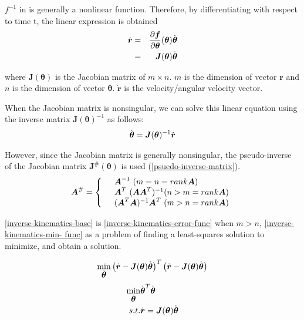 $f^{-1}$ in  is generally a nonlinear function.
Therefore, by differentiating  with respect to time t, the linear expression is obtained
\begin{eqnarray}
 \dot{\bm{r}} &=& \frac{\partial \bm{f}}{\partial \bm{\theta}}
   (\bm{\theta})\dot{\bm{\theta}} \\
 &=& \bm{J}(\bm{\theta})\dot{\bm{\theta}}
 \eqlabel{inverse-kinematics-base}
\end{eqnarray}

where $\bm{J}(\bm{\theta})$ is the Jacobian matrix of $m \times n$.
$m$ is the dimension of vector $\bm{r}$ and $n$ is the dimension of vector $\bm{\theta}$.
$\bm{\dot{r}}$ is the velocity/angular velocity vector.

When the Jacobian matrix is nonsingular, we can solve this linear equation using the inverse matrix $\bm{J}(\bm{\theta})^{-1}$ as follows:
\begin{eqnarray}
  \dot{\bm{\theta}} = \bm{J}(\bm{\theta})^{-1}\dot{\bm{r}}
  \eqlabel{inverse-kinematics}
\end{eqnarray}

However, since the Jacobian matrix is generally nonsingular, the pseudo-inverse of the Jacobian matrix $\bm{J}^{\#}(\bm{\theta})$ is used (\eqref{psuedo-inverse-matrix}).
\begin{eqnarray}
 \bm{A}^{\#} = \left\{
                \begin{array}{l l}
                 & \bm{A}^{-1} \ ( m = n = rank \bm{A}) \\
                 & \bm{A}^T \ (\bm{A}\bm{A}^T)^{-1} ( n > m = rank \bm{A}) \\
                 & (\bm{A}^T\bm{A})^{-1}\bm{A}^T \ ( m > n = rank \bm{A})
                \end{array}
	  \right.
 \eqlabel{psuedo-inverse-matrix}
\end{eqnarray}

\eqref{inverse-kinematics-base} is \eqref{inverse-kinematics-error-func} when $m>n$, \eqref{inverse-kinematics-min- func} as a problem of finding a least-squares solution to minimize, and obtain a solution.

\begin{eqnarray}
 \min_{\dot{\bm{\theta}}} \left(\dot{\bm{r}} - \bm{J}(\bm{\theta})\dot{\bm{\theta}}\right)^{T}
\left(\dot{\bm{r}} - \bm{J}(\bm{\theta})\dot{\bm{\theta}}\right)
 \eqlabel{inverse-kinematics-error-func}
\end{eqnarray}
\begin{eqnarray}
 \min_{\dot{\bm{\theta}}} & \dot{\bm{\theta}}^{T}\dot{\bm{\theta}}\\
\nonumber s.t. & \dot{\bm{r}} = \bm{J}(\bm{\theta})\dot{\bm{\theta}}
 \eqlabel{inverse-kinematics-min-func}
\end{eqnarray}

